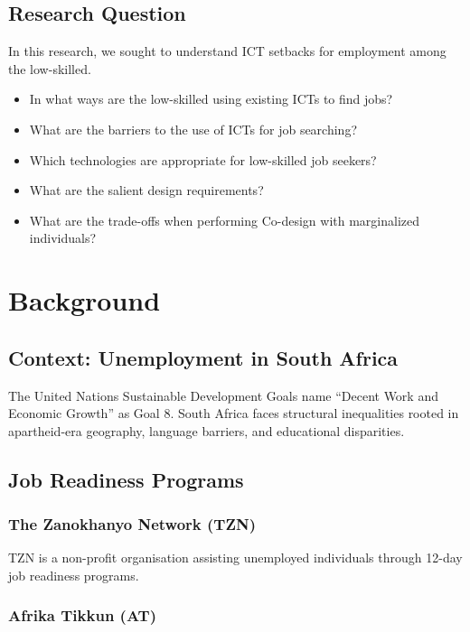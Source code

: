 \documentclass[12pt,a4paper]{report}
\begin{document}
\section{Research Question}

In this research, we sought to understand ICT setbacks for employment among the low-skilled.

\begin{itemize}
    \item In what ways are the low-skilled using existing ICTs to find jobs?
    \item What are the barriers to the use of ICTs for job searching?
    \item Which technologies are appropriate for low-skilled job seekers?
    \item What are the salient design requirements?
    \item What are the trade-offs when performing Co-design with marginalized individuals?
\end{itemize}

\chapter{Background}

\section{Context: Unemployment in South Africa}

The United Nations Sustainable Development Goals name “Decent Work and Economic Growth” as Goal 8. 
South Africa faces structural inequalities rooted in apartheid-era geography, language barriers, and educational disparities.

\section{Job Readiness Programs}

\subsection{The Zanokhanyo Network (TZN)}

TZN is a non-profit organisation assisting unemployed individuals through 12-day job readiness programs.

\subsection{Afrika Tikkun (AT)}
\end{document}
